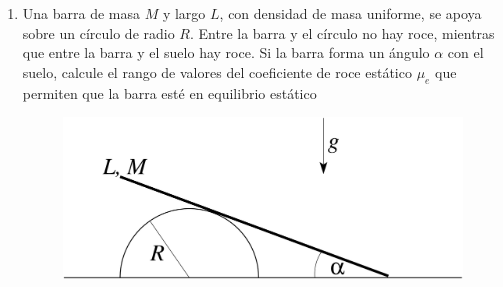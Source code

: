 \documentclass[letterpaper,11pt]{article}
\begin{document}
\begin{enumerate}
\item 
\begin{multicols}{2}
    Una barra de masa $M$ y largo $L$, con densidad de masa uniforme, se apoya sobre un círculo de radio $R$. Entre la barra y el círculo no hay roce, mientras que entre la barra y el suelo hay roce. Si la barra forma un ángulo $\alpha$ con el suelo, calcule el rango de valores del coeficiente de roce estático $\mu_e$ que permiten que la barra esté en equilibrio estático
    \columnbreak
    \begin{figure}[H]
        \centering
        \includegraphics[height=6.5\baselineskip]{2021-2/img/aux12/aux12-circ.PNG}
    \end{figure}
\end{multicols}

%   

\end{enumerate}
\end{document}
